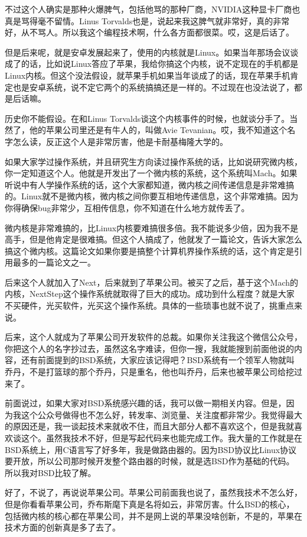 \documentclass[
  letterpaper,
  DIV=11,
  numbers=noendperiod]{scrreprt}
\begin{document}
不过这个人确实是那种火爆脾气，包括他骂的那种厂商，NVIDIA这种显卡厂商也真是骂得毫不留情。Linus
Torvalds也是，说起来我这脾气就非常好，真的非常好，从不骂人。所以我这个编程技术啊，什么各方面都很菜。哎，这是后话了。

但是后来呢，就是安卓发展起来了，使用的内核就是Linux。如果当年那场会议谈成了的话，比如说Linux答应了苹果，我给你搞这个内核，说不定现在的手机都是Linux内核。但这个没法假设，就苹果手机如果当年谈成了的话，现在苹果手机肯定也是安卓系统，说不定它两个的系统搞搞还是一样的。不过现在也没法说了，都是后话嘛。

历史你不能假设。在和Linus
Torvalds谈这个内核事件的时候，也就谈分手了。当然了，他的苹果公司里还是有牛人的，叫做Avie
Tevanian。哎，我不知道这个名字怎么读，反正这个人是非常厉害，他是卡耐基梅隆大学的。

如果大家学过操作系统，并且研究生方向读过操作系统的话，比如说研究微内核，你一定知道这个人。他就是开发出了一个微内核的系统，这个系统叫Mach。如果听说中有人学操作系统的话，这个大家都知道，微内核之间传递信息是非常难搞的。Linux就不是微内核，微内核之间你要互相地传递信息，这个非常难搞。因为你得确保bug非常少，互相传信息，你不知道在什么地方就传丢了。

微内核是非常难搞的，比Linux内核要难搞很多倍。我不能说多少倍，因为我不是高手，但是他肯定是很难搞。但这个人搞成了，他就发了一篇论文，告诉大家怎么搞这个微内核。这篇论文如果你要是搞整个计算机界操作系统的话，这个肯定是引用最多的一篇论文之一。

后来这个人就加入了Next，后来就到了苹果公司。被买了之后，基于这个Mach的内核，NextStep这个操作系统就取得了巨大的成功。成功到什么程度？就是大家不买硬件，光买软件，光买这个操作系统。具体的一些琐事也就不说了，挑重点来说。

后来，这个人就成为了苹果公司开发软件的总裁。如果你关注我这个微信公众号，你把这个人的名字抄过去，虽然这名字难读，但你一搜，我就能搜到前面他说的内容，还有前面提到的BSD系统，大家应该记得吧？BSD系统有一个领军人物就叫乔丹，不是打篮球的那个乔丹，只是重名，他也叫乔丹，后来也被苹果公司给挖过来了。

前面说过，如果大家对BSD系统感兴趣的话，我可以做一期相关内容。但是，因为我这个公众号做得也不怎么好，转发率、浏览量、关注度都非常少。我觉得最大的原因还是，我一谈起技术来就收不住，而且大部分人都不喜欢这个，但是我就喜欢谈这个。虽然我技术不好，但是写起代码来也能完成工作。我大量的工作就是在BSD系统上，用C语言写了好多年，我是做路由器的。因为BSD协议比Linux协议要开放，所以公司那时候开发整个路由器的时候，就是选BSD作为基础的代码。所以我对BSD比较了解。

好了，不说了，再说说苹果公司。苹果公司前面我也说了，虽然我技术不怎么好，但是你看看苹果公司，乔布斯麾下真是名将如云，非常厉害。什么BSD的核心，包括微内核的核心都在苹果公司，并不是网上说的苹果没啥创新，不是的，苹果在技术方面的创新真是多了去了。
\end{document}
